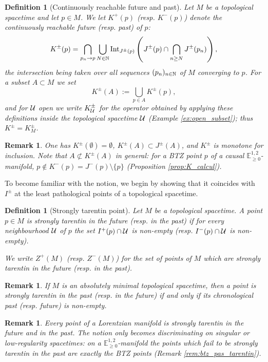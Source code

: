 \documentclass[a4paper,twoside]{article}
\newcommand{\mass}[1]{\mathbb{E}^{1,2}_{#1}}
\newtheorem{defi}[lem]{Definition}
\newtheorem{rem}[lem]{Remark}
\begin{document}
\begin{defi}[Continuously reachable future and past]\label{defi:futur_continue}
Let $M$ be a topological spacetime and let $p\in M$. We let $K^+(p)$ (resp. $K^-(p)$) denote the continuously reachable future (resp. past) of $p$:
$$K^\pm(p)=\bigcap_{p_n\rightarrow p} \bigcup_{N\in \mathbb{N}} \mathrm{Int}_{J^\pm(p)}\left( J^\pm(p)\cap \bigcap_{n\geq N} J^\pm(p_n)\right),
$$
the intersection being taken over all sequences $(p_n)_{n\in \mathbb{N}}$ of $M$ converging to $p$.
For a subset $A\subset M$ we set
$$K^\pm(A):=\bigcup_{p\in A} K^\pm(p),$$
and for $\mathcal{U}$ open we write $K^\pm_{\mathcal{U}}$ for the operator obtained by applying these definitions inside the topological spacetime $\mathcal{U}$ (Example \ref{ex:open_subset}); thus $K^\pm=K^\pm_M$.
\end{defi}
\begin{rem}\label{rem:K_ensemble}
One has $K^\pm(\emptyset)=\emptyset$, $K^\pm(A)\subset J^\pm(A)$, and $K^\pm$ is monotone for inclusion. Note that $A\not\subset K^\pm(A)$ in general: for a BTZ point $p$ of a causal $\mass{\geq0}$-manifold, $p\notin K^-(p)=J^-(p)\setminus\{p\}$ (Proposition \ref{prop:K_calcul}).
\end{rem}

To become familiar with the notion, we begin by showing that it coincides with $I^\pm$ at the
least pathological points of a topological spacetime.
\begin{defi}[Strongly tarentin point]\label{def:strongly_tarentin_point}
Let $M$ be a topological spacetime. A point $p\in M$ is strongly tarentin in the future (resp. in the past)
if for every neighbourhood $\mathcal{U}$ of $p$ the set $I^+(p)\cap \mathcal{U}$ is non-empty (resp. $I^-(p)\cap \mathcal{U}$ is non-empty).

We write $Z^+(M)$ (resp. $Z^-(M)$) for the set of points of $M$ which are strongly tarentin in the future (resp. in the past).
\end{defi}
\begin{rem}\label{rem:absolutely_minimal_topological_spacetime} If $M$ is an absolutely minimal topological spacetime, then a point is strongly tarentin
in the past (resp. in the future) if and only if its chronological past (resp. future) is non-empty.
\end{rem}
\begin{rem}\label{rem:lorentz_tarentin}
Every point of a Lorentzian manifold is strongly tarentin in the future and in the past. The notion
only becomes discriminating on singular or low-regularity spacetimes: on a $\mass{\geq0}$-manifold
the points which fail to be strongly tarentin in the past are exactly the BTZ points (Remark
\ref{rem:btz_pas_tarentin}).
\end{rem}
\end{document}
